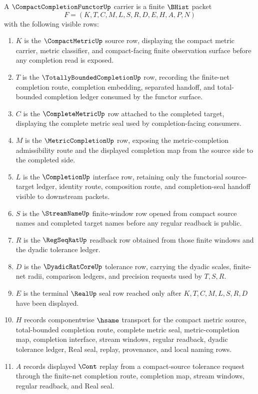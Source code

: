 \begin{definition}
\label{def:compact-completion-functor-carrier}
A $\CompactCompletionFunctorUp$ carrier is a finite $\BHist$ packet
$$
F=(K,T,C,M,L,S,R,D,E,H,A,P,N)
$$
with the following visible rows:
\begin{enumerate}
\item $K$ is the $\CompactMetricUp$ source row, displaying the compact metric carrier, metric classifier, and compact-facing finite observation surface before any completion read is exposed.
\item $T$ is the $\TotallyBoundedCompletionUp$ row, recording the finite-net completion route, completion embedding, separated handoff, and total-bounded completion ledger consumed by the functor surface.
\item $C$ is the $\CompleteMetricUp$ row attached to the completed target, displaying the complete metric seal used by completion-facing consumers.
\item $M$ is the $\MetricCompletionUp$ row, exposing the metric-completion admissibility route and the displayed completion map from the source side to the completed side.
\item $L$ is the $\CompletionUp$ interface row, retaining only the functorial source-target ledger, identity route, composition route, and completion-seal handoff visible to downstream packets.
\item $S$ is the $\StreamNameUp$ finite-window row opened from compact source names and completed target names before any regular readback is public.
\item $R$ is the $\RegSeqRatUp$ readback row obtained from those finite windows and the dyadic tolerance ledger.
\item $D$ is the $\DyadicRatCoreUp$ tolerance row, carrying the dyadic scales, finite-net radii, comparison ledgers, and precision requests used by $T,S,R$.
\item $E$ is the terminal $\RealUp$ seal row reached only after $K,T,C,M,L,S,R,D$ have been displayed.
\item $H$ records componentwise $\hsame$ transport for the compact metric source, total-bounded completion route, complete metric seal, metric-completion map, completion interface, stream windows, regular readback, dyadic tolerance ledger, Real seal, replay, provenance, and local naming rows.
\item $A$ records displayed $\Cont$ replay from a compact-source tolerance request through the finite-net completion route, completion map, stream windows, regular readback, and Real seal.

\end{enumerate}
\end{definition}
